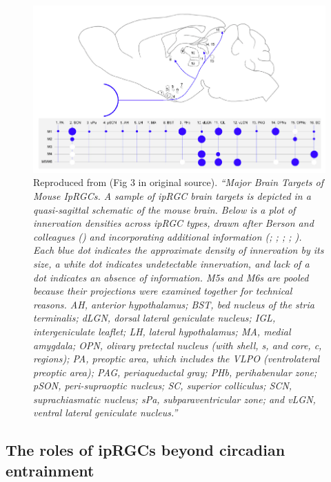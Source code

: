 \begin{figure}[htbp]
\includegraphics[max width=\textwidth, center]{figs/LitRev/projection.png}
\caption{Reproduced from \citet{do_melanopsin_2019} (Fig 3 in original source). \textit{``Major Brain Targets of Mouse IpRGCs. A sample of ipRGC brain targets is depicted in a quasi-sagittal schematic of the mouse brain. Below is a plot of innervation densities across ipRGC types, drawn after Berson and colleagues (\citet{quattrochi_m6_2019}) and incorporating additional information (\citet{ecker_melanopsin-expressing_2010}; \citet{hattar_central_2006}; \citet{huang_visual_2019}; \citet{morin_retinofugal_2014}; \citet{zhao_photoresponse_2014}). Each blue dot indicates the approximate density of innervation by its size, a white dot indicates undetectable innervation, and lack of a dot indicates an absence of information. M5s and M6s are pooled because their projections were examined together for technical reasons. AH, anterior hypothalamus; BST, bed nucleus of the stria terminalis; dLGN, dorsal lateral geniculate nucleus; IGL, intergeniculate leaflet; LH, lateral hypothalamus; MA, medial amygdala; OPN, olivary pretectal nucleus (with shell, s, and core, c, regions); PA, preoptic area, which includes the VLPO (ventrolateral preoptic area); PAG, periaqueductal gray; PHb, perihabenular zone; pSON, peri-supraoptic nucleus; SC, superior colliculus; SCN, suprachiasmatic nucleus; sPa, subparaventricular zone; and vLGN, ventral lateral geniculate nucleus.''}}
\label{fig:projection}
\end{figure}

\clearpage

\subsection{The roles of ipRGCs beyond circadian entrainment}
\label{sec:ipRGCbeyond}

